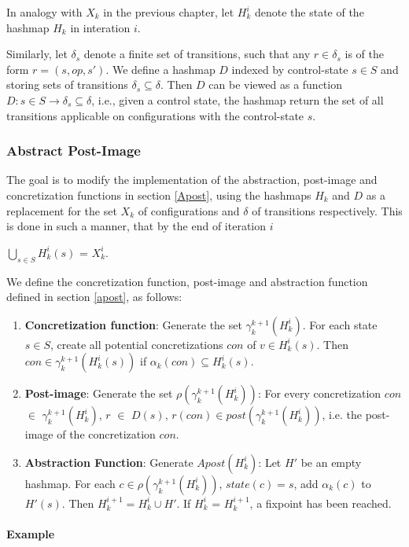 In analogy with $X_k$ in the previous chapter, let $H_k^i$ denote the state of the hashmap $H_k$ in interation $i$.

Similarly, let $\delta_s$ denote a finite set of transitions, such that any $r \in \delta_s$ is of the form $r = (s, op, s')$. We define a hashmap $D$ indexed by control-state $s \in S$ and storing sets of transitions $\delta_s \subseteq \delta$. Then $D$ can be viewed as a function $D : s \in S \rightarrow \delta_s \subseteq \delta$, i.e., given a control state, the hashmap return the set of all transitions applicable on configurations with the control-state $s$.

\subsubsection{Abstract Post-Image}
The goal is to modify the implementation of the abstraction, post-image and concretization functions in section \ref{Apost}, using the hashmaps $H_k$ and $D$ as a replacement for the set $X_k$ of configurations and $\delta$ of transitions respectively. This is done in such a manner, that by the end of iteration $i$

$\bigcup\limits_{s \in S} H_k^i(s)$ = $X_k^i$.

We define the concretization function, post-image and abstraction function defined in section \ref{apost}, as follows:

\begin{enumerate}
\item
\textbf{Concretization function}:
Generate the set $\gamma_k^{k+1}(H_k^i)$. For each state $s \in S$, create all potential concretizations $con$ of $v \in H_k^i(s)$. Then $con \in \gamma_k^{k+1}(H_k^i(s))$ if $\alpha_k(con) \subseteq H_k^i(s)$.

\item
\textbf{Post-image}:
Generate the set $\rho(\gamma_k^{k+1}(H_k^i))$: For every concretization $con$ $\in$ $\gamma_k^{k+1}(H_k^i)$, $r$ $\in$ $D(s)$, $r(con) \in post(\gamma_k^{k+1}(H_k^i))$, i.e. the post-image of the concretization $con$.

\item
\textbf{Abstraction Function}:
Generate $Apost(H_k^i)$: Let $H'$ be an empty hashmap. For each $c \in \rho(\gamma_k^{k+1}(H_k^i))$, $state(c) = s$,  add $\alpha_k(c)$ to $H'(s)$. Then $H_k^{i+1} = H_k^i \cup H'$. If $H_k^i$ = $H_k^{i+1}$, a fixpoint has been reached.
\end{enumerate}

\paragraph{Example}

